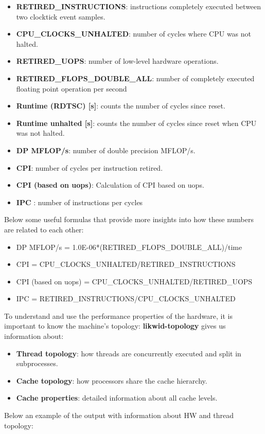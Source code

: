 \documentclass[11pt,a4paper,oneside,titlepage,openright]{book}
\begin{document}
\begin{itemize}
\item{\textbf{RETIRED\_INSTRUCTIONS}: instructions completely executed between two clocktick event samples.}
\item{\textbf{CPU\_CLOCKS\_UNHALTED}: number of cycles where CPU was not halted.}
\item{\textbf{RETIRED\_UOPS}: number of low-level hardware operations.}
\item{\textbf{RETIRED\_FLOPS\_DOUBLE\_ALL}: number of completely executed floating point operation per second  }
\item{\textbf{Runtime (RDTSC) [s]}: counts the number of cycles since reset. }
\item{\textbf{Runtime unhalted [s]}: counts the number of cycles since reset when CPU was not halted.}
\item{\textbf{DP MFLOP/s}:  number of double precision MFLOP/s.}
\item{\textbf{ CPI}: number of cycles per instruction retired.}
\item{\textbf{CPI (based on uops)}: Calculation of CPI based on uops.}
\item{\textbf{ IPC }: number of instructions per cycles}
\end{itemize}
Below some useful formulas that provide more insights into how these numbers are related to each other: 
\begin{itemize}
\item DP MFLOP/s = 1.0E-06*(RETIRED\_FLOPS\_DOUBLE\_ALL)/time
\item CPI = CPU\_CLOCKS\_UNHALTED/RETIRED\_INSTRUCTIONS
\item CPI (based on uops) = CPU\_CLOCKS\_UNHALTED/RETIRED\_UOPS
\item IPC = RETIRED\_INSTRUCTIONS/CPU\_CLOCKS\_UNHALTED
\end{itemize}
To understand and use the performance properties of the hardware, it is important to know the machine's topology: \textbf{likwid-topology} gives us information about: 
\begin{itemize}
\item \textbf{Thread topology}: how threads are concurrently executed and split in subprocesses. 
\item \textbf{Cache topology}: how processors share the cache hierarchy.
\item \textbf{Cache properties}: detailed information about all cache levels.
\end{itemize}
Below an example of the output with information about HW and thread topology:\\
\end{document}
